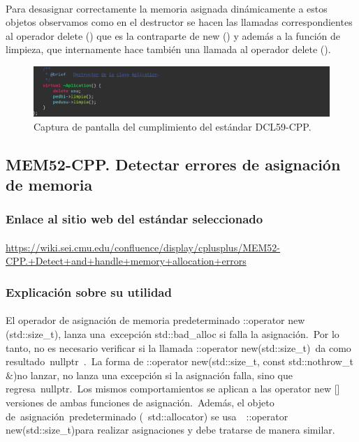 			\paragraph{}Para desasignar correctamente la memoria asignada dinámicamente a estos objetos observamos como en el destructor se hacen las llamadas correspondientes al operador delete () que es la contraparte de new () y además a la función de limpieza, que internamente hace también una llamada al operador delete ().
			
			\begin{figure}[H]
				\centering
				\includegraphics[scale=0.8]{img/img4.png}
				\caption{Captura de pantalla del cumplimiento del estándar DCL59-CPP.}
				\label{img4}
			\end{figure}
		
	\subsection{MEM52-CPP. Detectar errores de asignación de memoria}
	
		\subsubsection{Enlace al sitio web del estándar seleccionado}
		
			\paragraph{}\url{https://wiki.sei.cmu.edu/confluence/display/cplusplus/MEM52-CPP.+Detect+and+handle+memory+allocation+errors}
		
		\subsubsection{Explicación sobre su utilidad}
		
			\paragraph{}El operador de asignación de memoria predeterminado ::operator new (std::size\_t), lanza una excepción std::bad\_alloc si falla la asignación. Por lo tanto, no es necesario verificar si la llamada ::operator new(std::size\_t) da como resultado nullptr . La forma de ::operator new(std::size\_t, const std::nothrow\_t $\&$)no lanzar, no lanza una excepción si la asignación falla, sino que regresa nullptr. Los mismos comportamientos se aplican a las operator new [] versiones de ambas funciones de asignación. Además, el objeto de asignación predeterminado ( std::allocator) se usa  ::operator new(std::size\_t)para realizar asignaciones y debe tratarse de manera similar.
		
